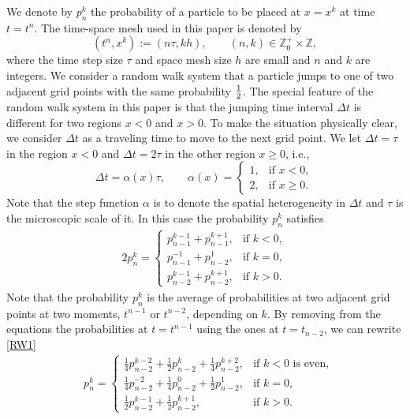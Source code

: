 \documentclass[a4paper,11pt]{article}
\def\Z{\mathbb{Z}}
\theoremstyle{remark}
\begin{document}
We denote by $p_n^k$ the probability of a particle to be placed at $x=x^k$ at time $t=t^n$. The time-space mesh used in this paper is denoted by
$$
(t^n,x^k):=(n\tau,kh),\qquad (n,k)\in \Z^+_0\times\Z,
$$
where the time step size $\tau$ and space mesh size $h$ are small and $n$ and $k$ are integers. We consider a random walk system that a particle jumps to one of two adjacent grid points with the same probability ${1\over2}$. The special feature of the random walk system in this paper is that the jumping time interval $\Delta t$ is different for two regions $x<0$ and $x>0$. To make the situation physically clear, we consider $\Delta t$ as a traveling time to move to the next grid point. We let $\Delta t=\tau$ in the region $x<0$ and $\Delta t=2\tau$ in the other region $x\ge0$, i.e.,
\begin{equation}\label{alpha}
\Delta t=\alpha(x)\tau,\qquad
\alpha(x) =
\left\{\begin{array}{ll}
        1, & \text{if } x<0,\\
        2, & \text{if } x\ge0.
        \end{array}\right.
\end{equation}
Note that the step function $\alpha$ is to denote the spatial heterogeneity in $\Delta t$ and $\tau$ is the microscopic scale of it. In this case the probability $p_n^k$ satisfies
\begin{equation} \label{RW1}\tag{RW1}
\begin{aligned}
    2p^k_n = \left\{\begin{array}{lr}
        p^{k-1} _{n-1} + p ^{k+1} _{n-1}, & \text{if } k<0,\\
        p^{-1} _{n-1} + p ^{1} _{n-2}, & \text{if } k=0,\\
        p^{k-1} _{n-2} + p ^{k+1} _{n-2}, & \text{if } k>0.
        \end{array}\right.
\end{aligned}
\end{equation}
Note that the probability $p^k_n$ is the average of probabilities at two adjacent grid points at two moments, $t^{n-1}$ or $t^{n-2}$, depending on $k$. By removing from the equations the probabilities at  $t=t^{n-1}$ using the ones at $t=t_{n-2}$, we can rewrite \eqref{RW1} 
\begin{equation} \label{RW2}\tag{RW2}
\begin{aligned}
    &p^{k}_n = \left\{\begin{array}{ll}
        \frac{1}{4}p^{k-2} _{n-2} + \frac{1}{2}p ^{k} _{n-2} + \frac{1}{4} p^{k+2}_{n-2}, & \text{if $k<0$ is even},\\
        \frac{1}{4}p^{-2} _{n-2} + \frac{1}{4}p^{0} _{n-2} + \frac{1}{2}p ^{1} _{n-2}, & \text{if $k=0$},\\
        \frac{1}{2}p^{k-1} _{n-2} + \frac{1}{2}p ^{k+1} _{n-2}, & \text{if } k>0.
        \end{array}\right. 
\end{aligned}
\end{equation}
\end{document}
